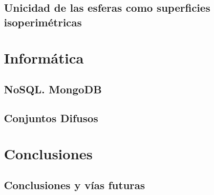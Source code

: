 \documentclass[ oneside,openany,titlepage,numbers=noenddot,headinclude,%
                footinclude=true,cleardoublepage=empty,abstractoff, %
                BCOR=5mm,paper=a4,fontsize=11pt,%
                spanish,american%
                ]{scrreprt}
\begin{document}
\chapter{Unicidad de las esferas como superficies isoperimétricas}


\part{Informática}

\chapter{NoSQL. MongoDB}


\chapter{Conjuntos Difusos}


\part{Conclusiones}

\chapter{Conclusiones y vías futuras}


%
\cleardoublepage
\cleardoublepage
\cleardoublepage
\end{document}
